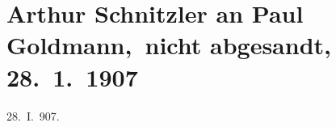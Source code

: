 

\renewcommand{\erwaehntePersonen}{Personen: Ludwig Fulda, Paul Goldmann, Gerhart Hauptmann, Hugo von Hofmannsthal, Rudolf Lothar}
\renewcommand{\erwaehnteOrte}{Orte: Deutschland, Wien}
\renewcommand{\erwaehnteWerke}{Werke: Der blinde Geronimo und sein Bruder, Der einsame Weg. Schauspiel in fünf Akten, Frau Bertha Garlan. Roman, Neue Freie Presse, Reigen. Zehn Dialoge, »Michael Kramer.«}
\section[Arthur Schnitzler an Paul Goldmann, nicht abgesandt, 28. 1. 1907]{Arthur Schnitzler an Paul Goldmann, nicht abgesandt,
               28. 1. 1907}
\nopagebreak{}
\rehead{ }\normalsize\beginnumbering{}
\toendnotes[C]{\smallbreak\pagebreak[2]}
\toendnotes[C]{\smallbreak}
\pstart
           \raggedleft{}{\pb}28. I. 907.\pend
           
